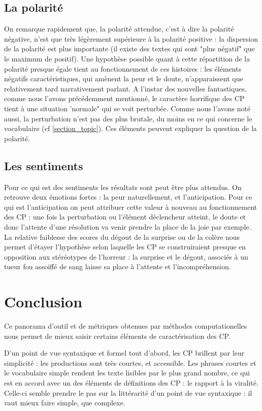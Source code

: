 \documentclass[12pt,a4paper,oneside,titlepage]{book} %
\begin{document}
\subsection{La polarité}
On remarque rapidement que, la polarité attendue, c'est à dire la polarité négative, n'est que très légèrement supérieure à la polarité positive :  la dispersion de la polarité est plus importante (il existe des textes qui sont "plus négatif" que le maximum de positif). 
Une hypothèse possible quant à cette répartition de la polarité presque égale tient au fonctionnement de ces histoires : les éléments négatifs caractéristiques, qui amènent la peur et le doute, n'apparaissent que relativement tard narrativement parlant. A l'instar des nouvelles fantastiques, comme nous l'avons précédemment mentionné, le caractère horrifique des CP tient à une situation 'normale"  qui se voit perturbée. Comme nous l'avons noté aussi, la perturbation n'est pas des plus brutale, du moins en ce qui concerne le vocabulaire (cf \ref{section_topic}). Ces éléments peuvent expliquer la question de la polarité.
	

\subsection{Les sentiments}
Pour ce qui est des sentiments les résultats sont peut être plus attendus. On retrouve deux émotions fortes : la peur naturellement, et l'anticipation.  Pour ce qui est l'anticipation on peut attribuer cette valeur à nouveau au fonctionnement des CP : une fois la perturbation ou l'élément déclencheur atteint, le doute et donc l'attente d'une résolution va venir prendre la place de la joie par exemple.
La relative faiblesse des scores du dégout de la surprise ou de la colère nous permet d'étayer l'hypothèse selon laquelle les CP se construiraient presque en opposition aux stéréotypes de l'horreur : la surprise et le dégout, associés à un tueur fou assoiffé de sang laisse sa place à l'attente et l'incompréhension.


\section{Conclusion}
Ce panorama d'outil et de métriques obtenues par méthodes computationelles nous permet de mieux saisir certains éléments de caractérisation des CP. 
\par
D'un point de vue syntaxique et formel tout d'abord,  les CP brillent par leur simplicité : les productions sont très courtes, et accessible. Les phrases courtes et le vocabulaire simple rendent les texte lisibles par le plus grand nombre, ce qui est en accord avec un des éléments de définitions des CP : le rapport à la viralité. Celle-ci semble prendre le pas sur la littérarité d'un point de vue syntaxique : il vaut mieux faire simple, que complexe.
\end{document}
